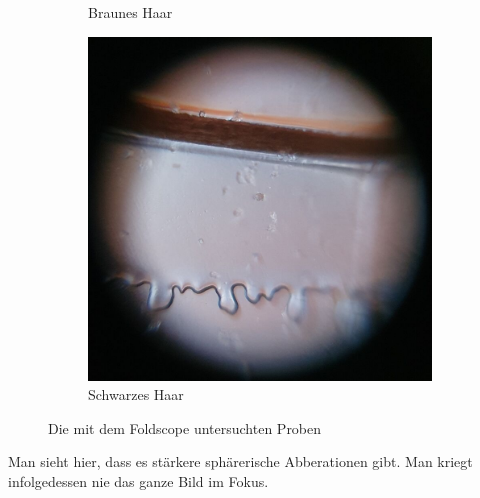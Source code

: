 \begin{figure}[H]
\begin{subfigure}[b]{0.3\textwidth}
				\caption{Braunes Haar}
				\label{fig:brownhair}
			\end{subfigure}
			\hspace{5pt}
			\begin{subfigure}[b]{0.3\textwidth}
				\includegraphics[width=\textwidth]{images/tv2/probe_Haar_Yudong.jpg}
				\caption{Schwarzes Haar}
				\label{fig:blackhair}
			\end{subfigure}
			\caption{Die mit dem Foldscope untersuchten Proben}
			\label{fig:tv2-proben}
			\vspace{-1.4em}
		\end{figure}
		Man sieht hier, dass es stärkere sphärerische Abberationen gibt. Man kriegt infolgedessen nie das ganze Bild im Fokus.
